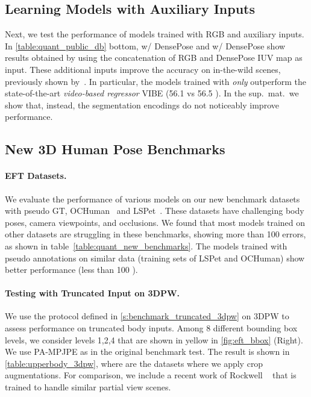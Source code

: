 \documentclass[10pt,twocolumn,letterpaper]{article}
\begin{document}
	


	
	\subsection{Learning Models with Auxiliary Inputs}\label{s:learning-auxiliary}
	
	Next, we test the performance of models trained with RGB and auxiliary inputs.
	In \cref{table:quant_public_db} bottom,  w/ DensePose and  w/ DensePose show results obtained by using the concatenation of RGB and  DensePose IUV map as input. These additional inputs improve the accuracy on in-the-wild scenes, previously shown by~\cite{rong2019delving}.
	In particular, the models trained with  \textit{only} outperform the state-of-the-art \emph{video-based regressor} VIBE (56.1 vs 56.5 ).
	In the sup.~mat.~we show that, instead, the segmentation encodings do not noticeably improve performance.
	
	
\subsection{New 3D Human Pose Benchmarks}\label{s:eft-bench}
	
	\paragraph{EFT Datasets.} We evaluate the performance of various models on our new benchmark datasets with pseudo GT, OCHuman~\cite{pose2seg2019} and LSPet~\cite{Johnson11}.
	These datasets have challenging body poses, camera viewpoints, and occlusions.
	We found that most models trained on other datasets are struggling in these benchmarks, showing more than 100  errors, as shown in table~\ref{table:quant_new_benchmarks}.
	The models trained with pseudo annotations on similar data (training sets of LSPet and OCHuman) show better performance (less than 100 ).
	\vspace{-10pt}
	
	\paragraph{Testing with Truncated Input on 3DPW.}\label{s:benchmark-trunc3dpw}
We use the protocol defined in \cref{s:benchmark_truncated_3dpw} on 3DPW to assess performance on truncated body inputs. Among 8 different bounding box levels, we consider levels 1,2,4 that are shown in yellow in \cref{fig:eft_bbox} (Right).
	We use PA-MPJPE as in the original benchmark test.
	The result is shown in \cref{table:upperbody_3dpw}, where  are the datasets where we apply crop augmentations.
	For comparison, we include a recent work of Rockwell \etal~\cite{Rockwell2020} that is trained to handle similar partial view scenes.
	
\end{document}

